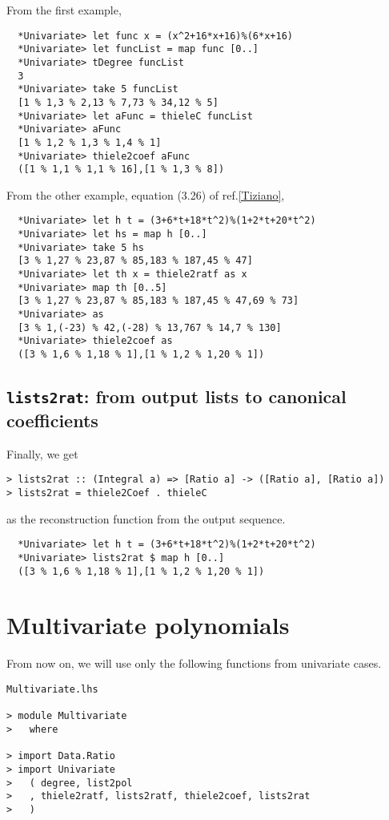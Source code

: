 \documentclass[11pt]{book}
\begin{document}
From the first example,
\begin{verbatim}
  *Univariate> let func x = (x^2+16*x+16)%(6*x+16)
  *Univariate> let funcList = map func [0..]
  *Univariate> tDegree funcList 
  3
  *Univariate> take 5 funcList 
  [1 % 1,3 % 2,13 % 7,73 % 34,12 % 5]
  *Univariate> let aFunc = thieleC funcList 
  *Univariate> aFunc
  [1 % 1,2 % 1,3 % 1,4 % 1]
  *Univariate> thiele2coef aFunc
  ([1 % 1,1 % 1,1 % 16],[1 % 1,3 % 8])
\end{verbatim}

From the other example, equation (3.26) of ref.\ref{Tiziano},
\begin{verbatim}
  *Univariate> let h t = (3+6*t+18*t^2)%(1+2*t+20*t^2)
  *Univariate> let hs = map h [0..]
  *Univariate> take 5 hs
  [3 % 1,27 % 23,87 % 85,183 % 187,45 % 47]
  *Univariate> let th x = thiele2ratf as x
  *Univariate> map th [0..5]
  [3 % 1,27 % 23,87 % 85,183 % 187,45 % 47,69 % 73]
  *Univariate> as
  [3 % 1,(-23) % 42,(-28) % 13,767 % 14,7 % 130]
  *Univariate> thiele2coef as
  ([3 % 1,6 % 1,18 % 1],[1 % 1,2 % 1,20 % 1])
\end{verbatim}

\subsection{\texttt{lists2rat}: from output lists to canonical coefficients}
Finally, we get
\begin{verbatim}
> lists2rat :: (Integral a) => [Ratio a] -> ([Ratio a], [Ratio a])
> lists2rat = thiele2Coef . thieleC
\end{verbatim}
as the reconstruction function from the output sequence.
\begin{verbatim}
  *Univariate> let h t = (3+6*t+18*t^2)%(1+2*t+20*t^2)
  *Univariate> lists2rat $ map h [0..]
  ([3 % 1,6 % 1,18 % 1],[1 % 1,2 % 1,20 % 1])
\end{verbatim}

\section{Multivariate polynomials}
From now on, we will use only the following functions from univariate cases.
\begin{verbatim}
Multivariate.lhs

> module Multivariate 
>   where

> import Data.Ratio
> import Univariate 
>   ( degree, list2pol
>   , thiele2ratf, lists2ratf, thiele2coef, lists2rat
>   )
\end{verbatim}
\end{document}
